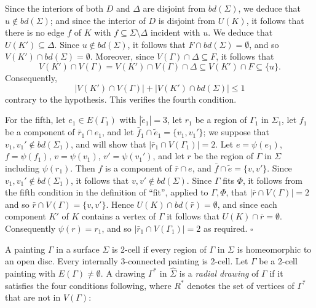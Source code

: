 Since the interiors of both $D$ and $\Delta$ are disjoint from $bd(\Sigma)$, we deduce that $u \notin bd(\Sigma)$; and since the interior of $D$ is disjoint from $U(K)$, it follows that there is no edge $f$ of $K$ with $f \subseteq \Sigma \setminus \Delta$ incident with $u$. We deduce that $U(K') \subseteq \Delta$. Since $u \notin bd(\Sigma)$, it follows that $F \cap bd(\Sigma) = \emptyset$, and so $V(K') \cap bd(\Sigma) = \emptyset$. Moreover, since $V(\Gamma) \cap \Delta \subseteq F$, it follows that
\begin{equation*}
V(K') \cap V(\Gamma) = V(K') \cap V(\Gamma) \cap \Delta \subseteq V(K') \cap F \subseteq \{u\}.
\end{equation*}
Consequently,
\begin{equation*}
|V(K') \cap V(\Gamma)| + |V(K') \cap bd(\Sigma)| \le 1
\end{equation*}
contrary to the hypothesis. This verifies the fourth condition.

For the fifth, let $e_1 \in E(\Gamma_1)$ with $|\tilde{e}_1| = 3$, let $r_1$ be a region of $\Gamma_1$ in $\Sigma_1$, let $f_1$ be a component of $\bar{r}_1 \cap e_1$, and let $\bar{f}_1 \cap \tilde{e}_1 = \{v_1, v_1'\}$; we suppose that $v_1, v_1' \notin bd(\Sigma_1)$, and will show that $|\bar{r}_1 \cap V(\Gamma_1)| = 2$. Let $e = \psi(e_1)$, $f = \psi(f_1)$, $v = \psi(v_1)$, $v' = \psi(v_1')$, and let $r$ be the region of $\Gamma$ in $\Sigma$ including $\psi(r_1)$. Then $f$ is a component of $\bar{r} \cap e$, and $\bar{f} \cap \tilde{e} = \{v, v'\}$. Since $v_1, v_1' \notin bd(\Sigma_1)$, it follows that $v, v' \notin bd(\Sigma)$. Since $\Gamma$ fits $\Phi$, it follows from the fifth condition in the definition of ``fit'', applied to $\Gamma, \Phi$, that $|\bar{r} \cap V(\Gamma)| = 2$ and so $\bar{r} \cap V(\Gamma) = \{v, v'\}$. Hence $U(K) \cap bd(\bar{r}) = \emptyset$, and since each component $K'$ of $K$ contains a vertex of $\Gamma$ it follows that $U(K) \cap \bar{r} = \emptyset$. Consequently $\psi(r) = r_1$, and so $|\bar{r}_1 \cap V(\Gamma_1)| = 2$ as required. $\square$

A painting $\Gamma$ in a surface $\Sigma$ is 2-cell if every region of $\Gamma$ in $\Sigma$ is homeomorphic to an open disc. Every internally 3-connected painting is 2-cell. Let $\Gamma$ be a 2-cell painting with $E(\Gamma) \ne \emptyset$. A drawing $\Gamma^*$ in $\hat{\Sigma}$ is a \textit{radial drawing} of $\Gamma$ if it satisfies the four conditions following, where $R^*$ denotes the set of vertices of $\Gamma^*$ that are not in $V(\Gamma)$:

